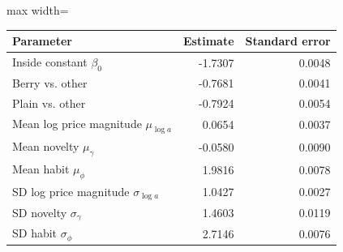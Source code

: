 \begin{adjustbox}{max width=\linewidth}
\begin{tabular}{lrr}\toprule
Parameter & Estimate & Standard error\\\midrule
Inside constant $\beta_0$ & -1.7307 & 0.0048 \\
Berry vs. other & -0.7681 & 0.0041 \\
Plain vs. other & -0.7924 & 0.0054 \\
Mean log price magnitude $\mu_{\log a}$ & 0.0654 & 0.0037 \\
Mean novelty $\mu_\gamma$ & -0.0580 & 0.0090 \\
Mean habit $\mu_\phi$ & 1.9816 & 0.0078 \\
SD log price magnitude $\sigma_{\log a}$ & 1.0427 & 0.0027 \\
SD novelty $\sigma_\gamma$ & 1.4603 & 0.0119 \\
SD habit $\sigma_\phi$ & 2.7146 & 0.0076 \\
\bottomrule\end{tabular}
\end{adjustbox}
